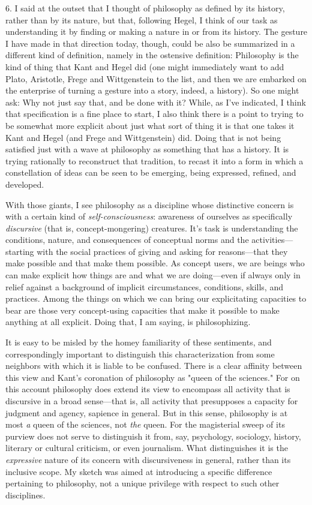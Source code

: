 6. I said at the outset that I thought of philosophy as defined by its
history, rather than by its nature, but that, following Hegel, I think
of our task as understanding it by finding or making a nature in or from
its history. The gesture I have made in that direction today, though,
could be also be summarized in a different kind of definition, namely in
the ostensive definition: Philosophy is the kind of thing that Kant and
Hegel did (one might immediately want to add Plato, Aristotle, Frege and
Wittgenstein to the list, and then we are embarked on the enterprise of
turning a gesture into a story, indeed, a history). So one might ask:
Why not just say that, and be done with it? While, as I've indicated, I
think that specification is a fine place to start, I also think there is
a point to trying to be somewhat more explicit about just what sort of
thing it is that one takes it Kant and Hegel (and Frege and
Wittgenstein) did. Doing that is not being satisfied just with a wave at
philosophy as something that has a history. It is trying rationally to
reconstruct that tradition, to recast it into a form in which a
constellation of ideas can be seen to be emerging, being expressed,
refined, and developed.

With those giants, I see philosophy as a discipline whose distinctive
concern is with a certain kind of \emph{self-consciousness}: awareness
of ourselves as specifically \emph{discursive} (that is,
concept-mongering) creatures. It's task is understanding the conditions,
nature, and consequences of conceptual norms and the
activities---starting with the social practices of giving and asking for
reasons---that they make possible and that make them possible. As
concept users, we are beings who can make explicit how things are and
what we are doing---even if always only in relief against a background
of implicit circumstances, conditions, skills, and practices. Among the
things on which we can bring our explicitating capacities to bear are
those very concept-using capacities that make it possible to make
anything at all explicit. Doing that, I am saying, is philosophizing.

It is easy to be misled by the homey familiarity of these sentiments,
and correspondingly important to distinguish this characterization from
some neighbors with which it is liable to be confused. There is a clear
affinity between this view and Kant's coronation of philosophy as "queen
of the sciences." For on this account philosophy does extend its view to
encompass all activity that is discursive in a broad sense---that is,
all activity that presupposes a capacity for judgment and agency,
sapience in general. But in this sense, philosophy is at most \emph{a}
queen of the sciences, not \emph{the} queen. For the magisterial sweep
of its purview does not serve to distinguish it from, say, psychology,
sociology, history, literary or cultural criticism, or even journalism.
What distinguishes it is the \emph{expressive} nature of its concern
with discursiveness in general, rather than its inclusive scope. My
sketch was aimed at introducing a specific difference pertaining to
philosophy, not a unique privilege with respect to such other
disciplines.

